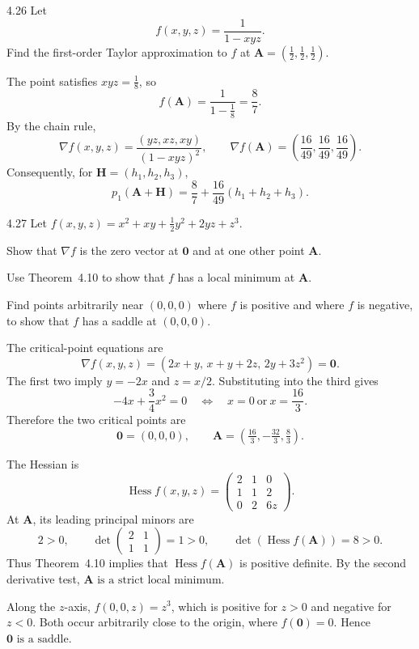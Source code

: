 \documentclass[11pt,oneside]{article}
\begin{document}
\begin{problem}{4.26}
Let
\[
 f(x,y,z)=\frac1{1-xyz}.
\]
Find the first-order Taylor approximation to $f$ at
$\mathbf A=(\frac12,\frac12,\frac12)$.
\end{problem}
\begin{solution}
The point satisfies $xyz=\frac18$, so
\[
 f(\mathbf A)=\frac1{1-\frac18}=\frac87.
\]
By the chain rule,
\[
 \nabla f(x,y,z)=
 \frac{(yz,xz,xy)}{(1-xyz)^2},
 \qquad
 \nabla f(\mathbf A)=\left(\frac{16}{49},\frac{16}{49},\frac{16}{49}\right).
\]
Consequently, for $\mathbf H=(h_1,h_2,h_3)$,
\[
 \boxed{p_1(\mathbf A+\mathbf H)
 =\frac87+\frac{16}{49}(h_1+h_2+h_3)}.
\]
\end{solution}

\begin{problem}{4.27}
Let $f(x,y,z)=x^2+xy+\frac12y^2+2yz+z^3$.
\begin{problemsubparts}
\item Show that $\nabla f$ is the zero vector at $\mathbf0$ and at
one other point $\mathbf A$.
\item Use Theorem~4.10 to show that $f$ has a local minimum at $\mathbf A$.
\item Find points arbitrarily near $(0,0,0)$ where $f$ is positive
and where $f$ is negative, to show that $f$ has a saddle at $(0,0,0)$.
\end{problemsubparts}
\end{problem}
\begin{solution}
\begin{problemsubparts}
\item The critical-point equations are
\[
 \nabla f(x,y,z)=(2x+y,\,x+y+2z,\,2y+3z^2)=\mathbf0.
\]
The first two imply $y=-2x$ and $z=x/2$. Substituting into
the third gives
\[
 -4x+\frac34x^2=0
 \quad\Longleftrightarrow\quad x=0\ \text{or}\ x=\frac{16}{3}.
\]
Therefore the two critical points are
\[
 \boxed{\mathbf0=(0,0,0),\qquad
 \mathbf A=(\tfrac{16}{3},-\tfrac{32}{3},\tfrac83)}.
\]
\item The Hessian is
\[
 \operatorname{Hess}f(x,y,z)=
 \begin{pmatrix}2&1&0\\1&1&2\\0&2&6z\end{pmatrix}.
\]
At $\mathbf A$, its leading principal minors are
\[
 2>0,\qquad
 \det\begin{pmatrix}2&1\\1&1\end{pmatrix}=1>0,\qquad
 \det(\operatorname{Hess}f(\mathbf A))=8>0.
\]
Thus Theorem~4.10 implies that $\operatorname{Hess}f(\mathbf A)$
is positive definite. By the second derivative test,
$\boxed{\mathbf A\text{ is a strict local minimum}}$.
\item Along the $z$-axis,
$f(0,0,z)=z^3$, which is positive for $z>0$ and negative
for $z<0$. Both occur arbitrarily close to the origin, where
$f(\mathbf0)=0$. Hence $\boxed{\mathbf0\text{ is a saddle}}$.
\end{problemsubparts}
\end{solution}
\end{document}
